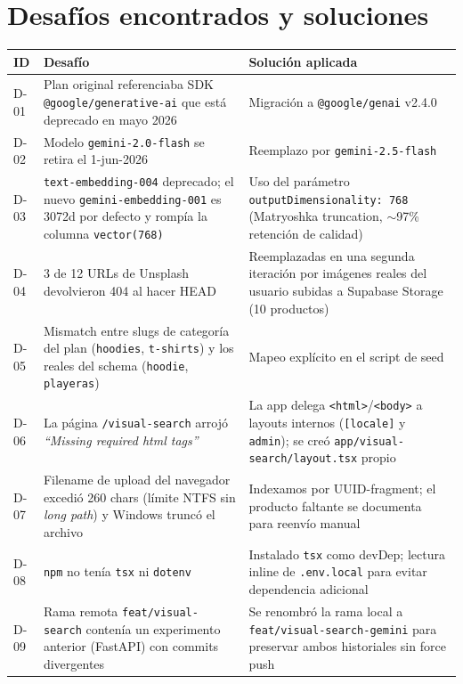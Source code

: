 \documentclass[11pt,letterpaper]{article}
\begin{document}
\section{Desafíos encontrados y soluciones}

\begin{longtable}{@{}l p{6.5cm} p{6cm}@{}}
\toprule
\textbf{ID} & \textbf{Desafío} & \textbf{Solución aplicada} \\
\midrule
\endhead
D-01 & Plan original referenciaba SDK \texttt{@google/generative-ai} que está deprecado en mayo 2026 & Migración a \texttt{@google/genai} v2.4.0 \\
D-02 & Modelo \texttt{gemini-2.0-flash} se retira el 1-jun-2026 & Reemplazo por \texttt{gemini-2.5-flash} \\
D-03 & \texttt{text-embedding-004} deprecado; el nuevo \texttt{gemini-embedding-001} es 3072d por defecto y rompía la columna \texttt{vector(768)} & Uso del parámetro \texttt{outputDimensionality: 768} (Matryoshka truncation, $\sim$97\% retención de calidad) \\
D-04 & 3 de 12 URLs de Unsplash devolvieron 404 al hacer HEAD & Reemplazadas en una segunda iteración por imágenes reales del usuario subidas a Supabase Storage (10 productos) \\
D-05 & Mismatch entre slugs de categoría del plan (\texttt{hoodies}, \texttt{t-shirts}) y los reales del schema (\texttt{hoodie}, \texttt{playeras}) & Mapeo explícito en el script de seed \\
D-06 & La página \texttt{/visual-search} arrojó \textit{``Missing required html tags''} & La app delega \texttt{<html>}/\texttt{<body>} a layouts internos (\texttt{[locale]} y \texttt{admin}); se creó \texttt{app/visual-search/layout.tsx} propio \\
D-07 & Filename de upload del navegador excedió 260 chars (límite NTFS sin \textit{long path}) y Windows truncó el archivo & Indexamos por UUID-fragment; el producto faltante se documenta para reenvío manual \\
D-08 & \texttt{npm} no tenía \texttt{tsx} ni \texttt{dotenv} & Instalado \texttt{tsx} como devDep; lectura inline de \texttt{.env.local} para evitar dependencia adicional \\
D-09 & Rama remota \texttt{feat/visual-search} contenía un experimento anterior (FastAPI) con commits divergentes & Se renombró la rama local a \texttt{feat/visual-search-gemini} para preservar ambos historiales sin force push \\
\bottomrule
\end{longtable}
\end{document}
